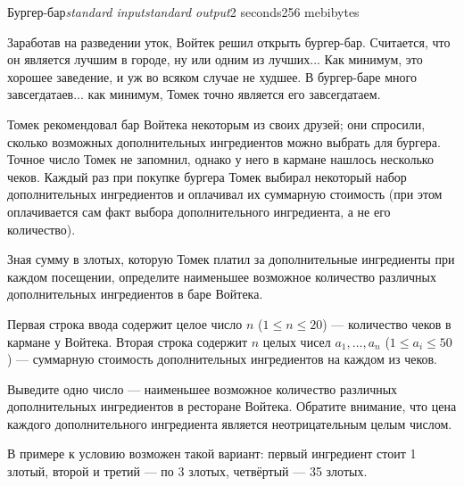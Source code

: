 \begin{problem}{Бургер-бар}{\textsl{standard input}}{\textsl{standard output}}{2 seconds}{256 mebibytes}{}

Заработав на разведении уток, Войтек решил открыть бургер-бар. Считается, что он является лучшим в городе, ну или одним из лучших...
Как минимум, это хорошее заведение, и уж во всяком случае не худшее. В бургер-баре много завсегдатаев... как минимум, Томек точно
является его завсегдатаем.

Томек рекомендовал бар Войтека некоторым из своих друзей; они спросили, сколько возможных дополнительных ингредиентов можно выбрать для
бургера. Точное число Томек не запомнил, однако у него в кармане нашлось несколько чеков. Каждый раз при покупке бургера Томек выбирал
некоторый набор дополнительных ингредиентов и оплачивал их суммарную стоимость (при этом оплачивается сам факт выбора дополнительного
ингредиента, а не его количество).

Зная сумму в злотых, которую Томек платил за дополнительные ингредиенты при каждом посещении, определите наименьшее возможное количество
различных дополнительных ингредиентов в баре Войтека.


\InputFile

Первая строка ввода содержит целое число $n$ ($1 \leq n \leq 20$) --- количество чеков в кармане у Войтека.
Вторая строка содержит $n$ целых чисел $a_1, \ldots, a_n$ ($1 \leq a_i \leq 50$) --- суммарную стоимость дополнительных ингредиентов на каждом из 
чеков.

\OutputFile

Выведите одно число --- наименьшее возможное количество различных дополнительных ингредиентов в ресторане Войтека. Обратите внимание, что 
цена каждого дополнительного ингредиента является неотрицательным целым числом.

\Examples
\begin{example}
%
\end{example}

\Note

В примере к условию возможен такой вариант: первый ингредиент стоит 1 злотый, второй и третий --- по 3 злотых, четвёртый --- 35 злотых.

\end{problem}

